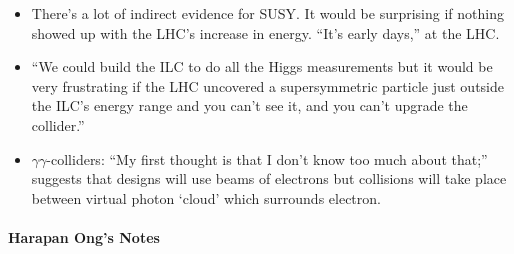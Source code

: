 \begin{itemize}
\item There's a lot of indirect evidence for SUSY. It would be surprising if nothing showed up with the LHC's increase in energy. “It's early days,” at the LHC.
\item ``We could build the ILC to do all the Higgs measurements but it would be very frustrating if the LHC uncovered a supersymmetric particle just outside the ILC's energy range and you can't see it, and you can't upgrade the collider.''

\item $\gamma\gamma$-colliders: ``My first thought is that I don't know too much about that;'' suggests that  designs will use beams of electrons but collisions will take place between virtual photon `cloud' which surrounds electron.
\end{itemize}

\paragraph{Harapan Ong's Notes}

